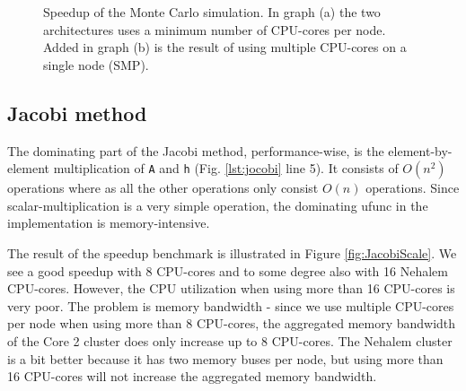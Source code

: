 \documentclass{sigplanconf}
\begin{document}
\begin{figure}%
  \begin{center}%
    \caption{Speedup of the Monte Carlo simulation. In graph (a) the two architectures uses a minimum number of CPU-cores per node. Added in graph (b) is the result of using multiple CPU-cores on a single node (SMP).}%
    \label{fig:MonteCarlo}%
  \end{center}
\end{figure}


\subsection{Jacobi method}
The dominating part of the Jacobi method, performance-wise, is the element-by-element multiplication of \texttt{A} and \texttt{h} (Fig. \ref{lst:jocobi} line 5). It consists of $O(n^2)$ operations where as all the other operations only consist $O(n)$ operations. Since scalar-multiplication is a very simple operation, the dominating ufunc in the implementation is memory-intensive.

The result of the speedup benchmark is illustrated in Figure \ref{fig:JacobiScale}. We see a good speedup with 8 CPU-cores and to some degree also with 16 Nehalem CPU-cores. However, the CPU utilization when using more than 16 CPU-cores is very poor. The problem is memory bandwidth - since we use multiple CPU-cores per node when using more than 8 CPU-cores, the aggregated memory bandwidth of the Core 2 cluster does only increase up to 8 CPU-cores. The Nehalem cluster is a bit better because it has two memory buses per node, but using more than 16 CPU-cores will not increase the aggregated memory bandwidth.
\end{document}
